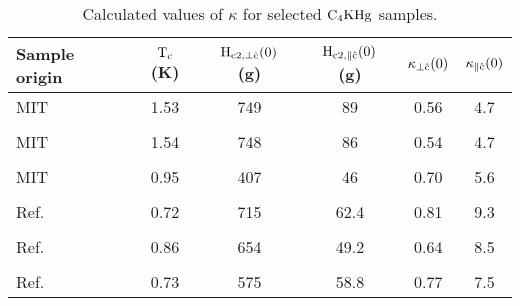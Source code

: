 \pagestyle{empty}

%
\begin{table}
\label{kappatable}
\caption[Calculated values of $\kappa$ for selected $\rm C_4KHg$
samples.]{Calculated values of $\kappa$ for selected $\rm C_4KHg$ samples.}
\begin{center}
\begin{tabular}{|l|ccccc|}
\hline
Sample origin & $\rm T_c$ (K) & $\rm H_{c2,\perp\hat{c}}(0)$ (g) & $\rm H_{c2,\parallel\hat{c}}(0)$ (g) & $\rm \kappa_{\perp\hat{c}}(0)$ & $\rm \kappa_{\parallel\hat{c}}(0)$\\
\hline
MIT & 1.53 & 749 & 89 & 0.56 & 4.7\\
& & & & & \\
MIT & 1.54 & 748 & 86 & 0.54 & 4.7\\
& & & & & \\
MIT & 0.95 & 407 & 46 & 0.70 & 5.6\\
& & & & & \\
Ref.~\cite{iye82} & 0.72 & 715 & 62.4 & 0.81 & 9.3\\
& & & & & \\
Ref.~\cite{iye82} & 0.86 & 654 & 49.2 & 0.64 & 8.5\\
& & & & & \\
Ref.~\cite{iye82} & 0.73 & 575 & 58.8 & 0.77 & 7.5\\
\hline
\end{tabular}
\end{center}

\end{table}
%

